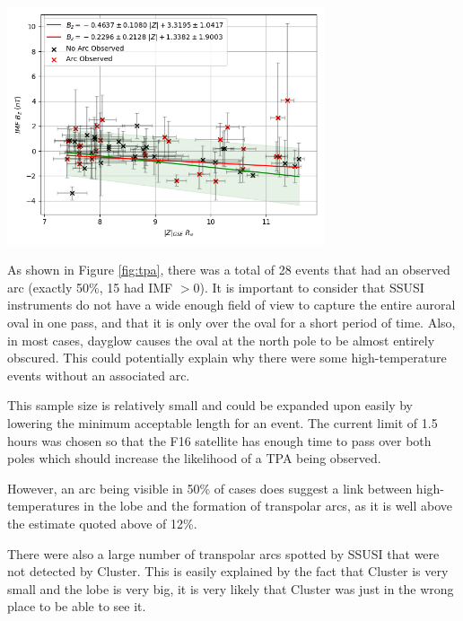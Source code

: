 \documentclass[12pt]{article}
\newenvironment{Figure}
  {\par\medskip\noindent\minipage{\linewidth}}
  {\endminipage\par\medskip}
\begin{document}
\begin{Figure}
    \centering
    \includegraphics[width=0.7\textwidth]{tpa.png}
    \label{fig:tpa}
\end{Figure}

As shown in Figure \ref{fig:tpa}, there was a total of 28 events that had an observed arc (exactly 50\%, 15 had IMF $> 0$). It is important to consider that SSUSI instruments do not have a wide enough field of view to capture the entire auroral oval in one pass, and that it is only over the oval for a short period of time. Also, in most cases, dayglow causes the oval at the north pole to be almost entirely obscured. This could potentially explain why there were some high-temperature events without an associated arc.

This sample size is relatively small and could be expanded upon easily by lowering the minimum acceptable length for an event. The current limit of 1.5 hours was chosen so that the F16 satellite has enough time to pass over both poles which should increase the likelihood of a TPA being observed.

However, an arc being visible in 50\% of cases does suggest a link between high-temperatures in the lobe and the formation of transpolar arcs, as it is well above the estimate quoted above of 12\%. 

There were also a large number of transpolar arcs spotted by SSUSI that were not detected by Cluster. This is easily explained by the fact that Cluster is very small and the lobe is very big, it is very likely that Cluster was just in the wrong place to be able to see it.
\end{document}

